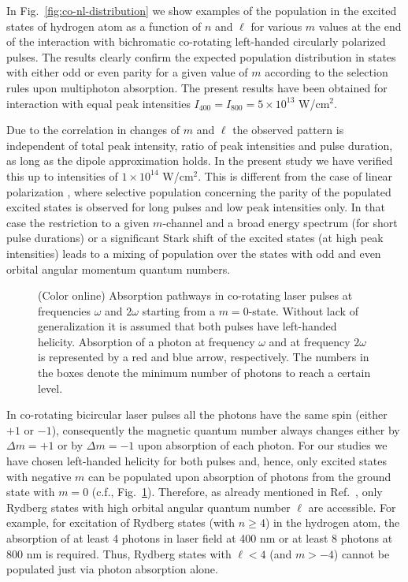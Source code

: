 In Fig.~\ref{fig:co-nl-distribution} we show examples of the population in the excited states of hydrogen atom as a function of $n$ and $\ell$ for various $m$ values at the end of the interaction with bichromatic co-rotating left-handed circularly polarized pulses. The results clearly confirm the expected population distribution in states with either odd or even parity for a given value of $m$ according to the selection rules upon multiphoton absorption. The present results have been obtained for interaction with equal peak intensities $I_{400} = I_{800} = 5\times 10^{13}$ W/cm$^2$. 

Due to the correlation in changes of $m$ and $\ell$ the observed pattern is independent of total peak intensity, ratio of peak intensities and pulse duration, as long as the dipole approximation holds. In the present study we have verified this up to intensities of $1 \times 10^{14}$ W/cm$^2$. This is different from the case of linear polarization \cite{venzke2018_ryd}, where selective population concerning the parity of the populated excited states is observed for long pulses and low peak intensities only. In that case the restriction to a given $m$-channel and a broad energy spectrum (for short pulse durations) or a significant Stark shift of the excited states (at high peak intensities) leads to a mixing of population over the states with odd and even orbital angular momentum quantum numbers.

\begin{figure}[!ht]
 \centering
 \caption{\label{fig:co-pathways}
 (Color online) Absorption pathways in co-rotating laser pulses at frequencies $\omega$ and $2 \omega$ starting from a $m=0$-state. Without lack of generalization it is assumed that both pulses have left-handed helicity. Absorption of a photon at frequency $\omega$ and at frequency $2 \omega$ is represented by a red and blue arrow, respectively. The numbers in the boxes denote the minimum number of photons to reach a certain level.
 }
 \end{figure}

In co-rotating bicircular laser pulses all the photons have the same spin (either $+1$ or $-1$), consequently the magnetic quantum number always changes either by $\Delta m = +1$ or by $\Delta m = -1$ upon absorption of each photon. For our studies we have chosen left-handed helicity for both pulses and, hence, only excited states with negative $m$ can be populated upon absorption of photons from the ground state with $m=0$ (c.f., Fig.\ \ref{fig:co-pathways}). Therefore, as already mentioned in Ref.\ \cite{mancuso2017}, only Rydberg states with high orbital angular quantum number $\ell$ are accessible. For example, for excitation of Rydberg states (with $n \ge 4$) in the hydrogen atom, the absorption of at least 4 photons in laser field at 400 nm or at least 8 photons at 800 nm is required. Thus, Rydberg states with $\ell < 4$ (and $m > -4$) cannot be populated just via photon absorption alone.

